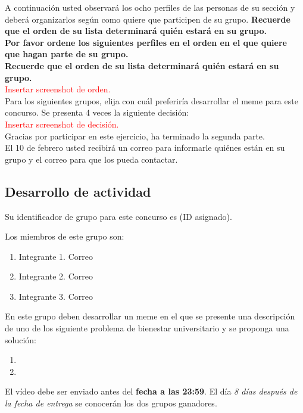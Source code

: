 A continuación usted observará los ocho perfiles de las personas de su sección y deberá organizarlos según como quiere que participen de su grupo. \textbf{Recuerde que el orden de su lista determinará quién estará en su grupo.}\\
\textbf{Por favor ordene los siguientes perfiles en el orden en el que quiere que hagan parte de su grupo.\\
Recuerde que el orden de su lista determinará quién estará en su grupo.}\\
\textcolor{red}{Insertar screenshot de orden.}\\
Para los siguientes grupos, elija con cuál preferiría desarrollar el meme para este concurso. Se presenta 4 veces la siguiente decisión:\\
\textcolor{red}{Insertar screenshot de decisión.}\\
Gracias por participar en este ejercicio, ha terminado la segunda parte.\\
El 10 de febrero usted recibirá un correo para informarle quiénes están en su grupo y el correo para que los pueda contactar.

\subsection{Desarrollo de actividad}
Su identificador de grupo para este concurso es (ID asignado). 

Los miembros de este grupo son:
\begin{enumerate}
    \item Integrante 1. Correo
    \item Integrante 2. Correo
    \item Integrante 3. Correo
\end{enumerate}
En este grupo deben desarrollar un meme en el que se presente una descripción de uno de los siguiente problema de bienestar universitario y se proponga una solución:
\begin{enumerate}
\item 
\item 
\end{enumerate}

El vídeo debe ser enviado antes del \textbf{fecha a las 23:59}. 
El día \textit{8 días después de la fecha de entrega} se conocerán los dos grupos ganadores. 

